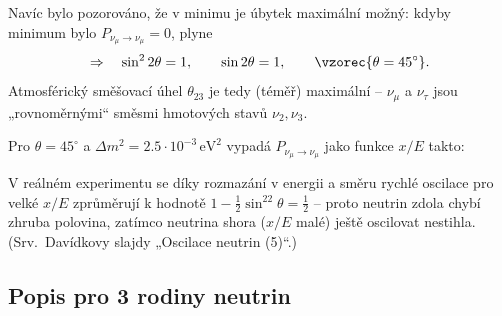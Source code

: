 Navíc bylo pozorováno, že v minimu je úbytek maximální možný: kdyby minimum bylo \(P_{\nu_\mu\to\nu_\mu}=0\), plyne
\[
  \Rightarrow\quad \sin^22\theta=1,\qquad \sin2\theta=1,\qquad \vzorec{\theta=45^\circ}.
\]
Atmosférický směšovací úhel \(\theta_{23}\) je tedy (téměř) maximální -- \(\nu_\mu\) a \(\nu_\tau\) jsou „rovnoměrnými“ směsmi hmotových stavů \(\nu_2,\nu_3\).

\begin{vysvetleni}
Pro \(\theta=45^\circ\) a \(\Delta m^2=2.5\cdot10^{-3}\,\mathrm{eV^2}\) vypadá \(P_{\nu_\mu\to\nu_\mu}\) jako funkce \(x/E\) takto:
\begin{center}
\end{center}
V reálném experimentu se díky rozmazání v energii a směru rychlé oscilace pro velké \(x/E\) zprůměrují k hodnotě \(1-\frac12\sin^22\theta=\frac12\) -- proto neutrin zdola chybí zhruba polovina, zatímco neutrina shora (\(x/E\) malé) ještě oscilovat nestihla. (Srv.\ Davídkovy slajdy „Oscilace neutrin (5)“.)
\end{vysvetleni}

\subsection{Popis pro 3 rodiny neutrin}

